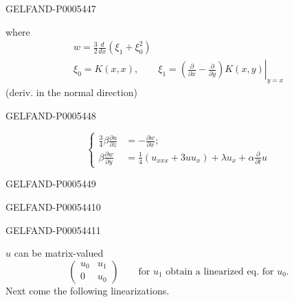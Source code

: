 \begin{GelfandAdjacentEvidence}{GELFAND-P000544}{7}

where
\begin{gather*}
w=\frac32\frac d{dx}(\xi_1+\xi_0^2)\\
\xi_0=K(x,x),\qquad
\xi_1=\left.\left(\frac{\partial}{\partial x}-\frac{\partial}{\partial y}\right)
K(x,y)\right|_{y=x}
\end{gather*}
\hfill (deriv. in the normal direction)\par
{}
\end{GelfandAdjacentEvidence}
\begin{GelfandAdjacentEvidence}{GELFAND-P000544}{8}


\[
\left\{\begin{aligned}
\frac34\beta\frac{\partial u}{\partial z}&=-\frac{\partial w}{\partial x};\\
\beta\frac{\partial w}{\partial y}
&=\frac14\left(u_{xxx}+3uu_x\right)
+\lambda u_x+\alpha\frac{\partial}{\partial t}u
\end{aligned}\right.
\]
\end{GelfandAdjacentEvidence}
\begin{GelfandAdjacentEvidence}{GELFAND-P000544}{9}

\end{GelfandAdjacentEvidence}
\begin{GelfandAdjacentEvidence}{GELFAND-P000544}{10}

\end{GelfandAdjacentEvidence}
\begin{GelfandAdjacentEvidence}{GELFAND-P000544}{11}


\(u\) can be matrix-valued
\[
\begin{pmatrix}u_0&u_1\\0&u_0\end{pmatrix}
\qquad\text{for }u_1\text{ obtain a linearized eq. for }u_0.
\]
Next come the following linearizations.
\end{GelfandAdjacentEvidence}
